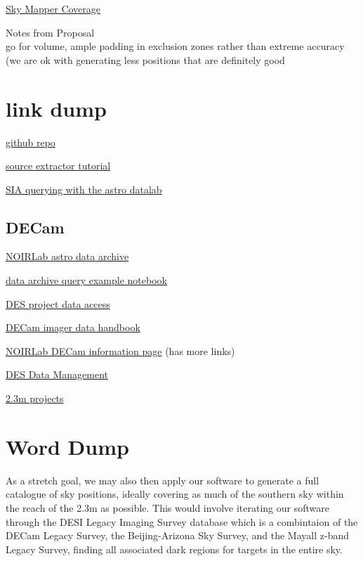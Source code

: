 \documentclass{article}
\begin{document}
\href{https://datalab.noirlab.edu/skymapper.php#:~:text=SMSS%20published%20its%20Fourth%20Data,observed%20up%20to%20%2B28%C2%B0.} {Sky Mapper Coverage}

Notes from Proposal\\
go for volume, ample padding in exclusion zones rather than extreme accuracy (we are ok with generating less positions that are definitely good

  \section{link dump}

  \href{https://github.com/cyb0rb/WiFeS_Catalog}{github repo}
  
  \href{https://sep.readthedocs.io/en/v1.1.x/tutorial.html}{source extractor tutorial}

  \href{https://github.com/astro-datalab/notebooks-latest/blob/aa7e2954d538632a5f0a26665c91906ca2c9cfbc/04_HowTos/SiaService/How_to_use_the_Simple_Image_Access_service.ipynb}{SIA querying with the astro datalab}

\subsection{DECam}
  \href{https://astroarchive.noirlab.edu/api/docs/}{NOIRLab astro data archive}

  \href{https://github.com/NOAO/nat-nb/blob/master/sia.ipynb}{data archive query example notebook}

  \href{https://www.darkenergysurvey.org/the-des-project/data-access/}{DES project data access}

  \href{https://noirlab.edu/science/sites/default/files/media/archives/documents/scidoc0436.pdf}{DECam imager data handbook}
  
  \href{https://noirlab.edu/science/programs/ctio/instruments/Dark-Energy-Camera}{NOIRLab DECam information page} (has more links)
  
  \href{https://des.ncsa.illinois.edu/releases/other}{DES Data Management}

  \href{https://aus01.safelinks.protection.outlook.com/?url=https}{2.3m projects}


\section{Word Dump}

As a stretch goal, we may also then apply our software to generate a full catalogue of sky positions, ideally covering as much of the southern sky within the reach of the 2.3m as possible. This would involve iterating our software through the DESI Legacy Imaging Survey database which is a combintaion of the DECam Legacy Survey, the Beijing-Arizona Sky Survey, and the Mayall z-band Legacy Survey, finding all associated dark regions for targets in the entire sky.
\end{document}
